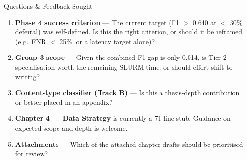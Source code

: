 \documentclass[aspectratio=169, 12pt]{beamer}
\begin{document}
\begin{frame}[shrink=15]{Questions \& Feedback Sought}
  \begin{enumerate}
    \setlength\itemsep{8pt}
    \item \textbf{Phase 4 success criterion} --- The current target (F1 $>$ 0.640 at
          $<$ 30\% deferral) was self-defined. Is this the right criterion, or should it
          be reframed (e.g.\ FNR $<$ 25\%, or a latency target alone)?

    \item \textbf{Group 3 scope} --- Given the combined F1 gap is only 0.014, is
          Tier 2 specialisation worth the remaining SLURM time, or should effort shift
          to writing?

    \item \textbf{Content-type classifier (Track B)} --- Is this a thesis-depth
          contribution or better placed in an appendix?

    \item \textbf{Chapter 4 --- Data Strategy} is currently a 71-line stub.
          Guidance on expected scope and depth is welcome.

    \item \textbf{Attachments} --- Which of the attached chapter drafts should be
          prioritised for review?
  \end{enumerate}
\end{frame}
\end{document}
